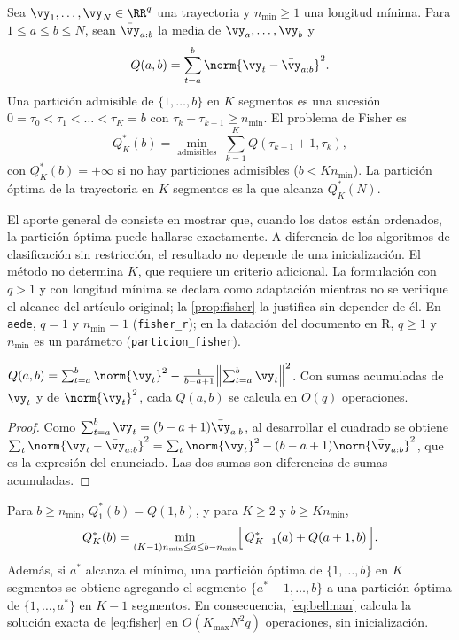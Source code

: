 \begin{definicion}\label{def:fisher}
Sea $\vy_1,\dots,\vy_N\in\RR^{q}$ una trayectoria y $n_{\min}\ge1$ una longitud mínima. Para
$1\le a\le b\le N$, sean $\bar\vy_{a:b}$ la media de $\vy_a,\dots,\vy_b$ y
\[
  Q(a,b)=\sum_{t=a}^{b}\norm{\vy_t-\bar\vy_{a:b}}^2 .
\]
Una partición admisible de $\{1,\dots,b\}$ en $K$ segmentos es una sucesión
$0=\tau_0<\tau_1<\dots<\tau_K=b$ con $\tau_k-\tau_{k-1}\ge n_{\min}$. El problema de Fisher es
\begin{equation}\label{eq:fisher}
  Q^\ast_K(b)=\min_{\text{admisibles}}\;\sum_{k=1}^{K}Q(\tau_{k-1}+1,\tau_k),
\end{equation}
con $Q^\ast_K(b)=+\infty$ si no hay particiones admisibles ($b<Kn_{\min}$). La partición óptima
de la trayectoria en $K$ segmentos es la que alcanza $Q^\ast_K(N)$.
\end{definicion}

El aporte general de \textcite{fisher_1958} consiste en mostrar que, cuando los datos están
ordenados, la partición óptima puede hallarse exactamente. A diferencia de los algoritmos de
clasificación sin restricción, el resultado no depende de una inicialización. El método no
determina $K$, que requiere un criterio adicional. La formulación con $q>1$ y con longitud mínima
se declara como adaptación mientras no se verifique el alcance del artículo original; la
\cref{prop:fisher} la justifica sin depender de él. En \texttt{aede}, $q=1$ y $n_{\min}=1$
(\texttt{fisher\_r}); en la datación del documento en R, $q\ge1$ y $n_{\min}$ es un parámetro
(\texttt{particion\_fisher}).

\begin{lema}\label{lem:costo}
$Q(a,b)=\sum_{t=a}^{b}\norm{\vy_t}^2-\frac{1}{b-a+1}\Bigl\lVert\sum_{t=a}^{b}\vy_t\Bigr\rVert^2$.
Con sumas acumuladas de $\vy_t$ y de $\norm{\vy_t}^2$, cada $Q(a,b)$ se calcula en $O(q)$
operaciones.
\end{lema}

\begin{proof}
Como $\sum_{t=a}^{b}\vy_t=(b-a+1)\bar\vy_{a:b}$, al desarrollar el cuadrado se obtiene
$\sum_t\norm{\vy_t-\bar\vy_{a:b}}^2=\sum_t\norm{\vy_t}^2-(b-a+1)\norm{\bar\vy_{a:b}}^2$, que es la
expresión del enunciado. Las dos sumas son diferencias de sumas acumuladas.
\end{proof}

\begin{proposicion}\label{prop:fisher}
Para $b\ge n_{\min}$, $Q^\ast_1(b)=Q(1,b)$, y para $K\ge2$ y $b\ge Kn_{\min}$,
\begin{equation}\label{eq:bellman}
  Q^\ast_K(b)=\min_{(K-1)n_{\min}\le a\le b-n_{\min}}\Bigl[\,Q^\ast_{K-1}(a)+Q(a+1,b)\,\Bigr].
\end{equation}
Además, si $a^\ast$ alcanza el mínimo, una partición óptima de $\{1,\dots,b\}$ en $K$ segmentos
se obtiene agregando el segmento $\{a^\ast+1,\dots,b\}$ a una partición óptima de
$\{1,\dots,a^\ast\}$ en $K-1$ segmentos. En consecuencia, \cref{eq:bellman} calcula la solución
exacta de \cref{eq:fisher} en $O(K_{\max}N^2q)$ operaciones, sin inicialización.
\end{proposicion}

